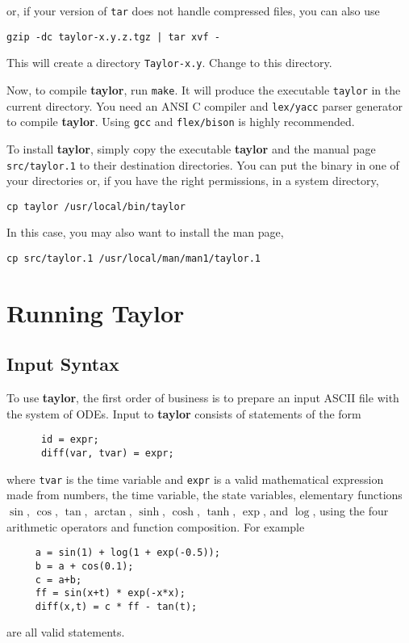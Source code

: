 \documentclass{article}
\begin{document}
\noindent
or, if your version of {\tt tar} does not handle compressed files, you
can also use

{\tt gzip -dc taylor-x.y.z.tgz | tar xvf - }

\noindent
This will create a directory {\tt Taylor-x.y}.
Change to this directory.

Now, to compile {\bf taylor}, run {\tt make}.
It will produce the executable {\tt taylor}
in the current directory.  You need an ANSI 
C compiler and {\tt lex/yacc} parser generator
to compile {\bf taylor}. Using {\tt gcc} and
{\tt flex/bison} is highly recommended.

To install {\bf taylor}, simply copy the executable
{\bf taylor} and the manual page {\tt src/taylor.1}
to their destination directories. You can put the binary
in one of your directories or, if you have the right permissions,
in a system directory,

{\tt cp taylor /usr/local/bin/taylor}

\noindent
In this case, you may also want to install the man page,

{\tt cp src/taylor.1 /usr/local/man/man1/taylor.1}

\section{Running Taylor}

\subsection{Input Syntax}\label{sec:is}
To use {\bf taylor}, the first order of business
is to prepare an input ASCII file with the system of ODEs.
Input to {\bf taylor} consists of statements of the form
\begin{verbatim}
      id = expr;
      diff(var, tvar) = expr;
\end{verbatim}
where {\tt tvar} is the time variable and {\tt expr} 
is a valid mathematical expression made from
numbers, the time variable, the state variables,
elementary functions $\sin$, $\cos$, $\tan$, $\arctan$, 
$\sinh$, $\cosh$, $\tanh$,
$\exp$, and $\log$, using the four arithmetic
operators and function composition. For example
\begin{verbatim}
     a = sin(1) + log(1 + exp(-0.5));
     b = a + cos(0.1);
     c = a+b;
     ff = sin(x+t) * exp(-x*x);
     diff(x,t) = c * ff - tan(t);
\end{verbatim}
are all valid statements.
\end{document}
